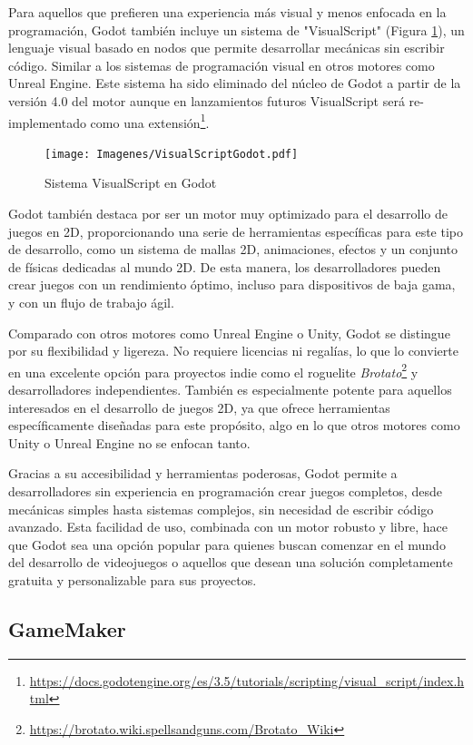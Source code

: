 Para aquellos que prefieren una experiencia más visual y menos enfocada en la programación, Godot también incluye un sistema de "VisualScript" (Figura \ref{fig:Godot_VisualScript_Figure}), un lenguaje visual basado en nodos que permite desarrollar mecánicas sin escribir código. Similar a los sistemas de programación visual en otros motores como Unreal Engine. Este sistema ha sido eliminado del núcleo de Godot a partir de la versión 4.0 del motor aunque en lanzamientos futuros VisualScript será re-implementado como una extensión\footnote{\url{https://docs.godotengine.org/es/3.5/tutorials/scripting/visual_script/index.html}}.

\begin{figure}[h]
	\centering
	\texttt{[image: Imagenes/VisualScriptGodot.pdf]}
	\caption{Sistema VisualScript en Godot}
	\label{fig:Godot_VisualScript_Figure}
\end{figure}
Godot también destaca por ser un motor muy optimizado para el desarrollo de juegos en 2D, proporcionando una serie de herramientas específicas para este tipo de desarrollo, como un sistema de mallas 2D, animaciones, efectos y un conjunto de físicas dedicadas al mundo 2D. De esta manera, los desarrolladores pueden crear juegos con un rendimiento óptimo, incluso para dispositivos de baja gama, y con un flujo de trabajo ágil.

Comparado con otros motores como Unreal Engine o Unity, Godot se distingue por su flexibilidad y ligereza. No requiere licencias ni regalías, lo que lo convierte en una excelente opción para proyectos indie como el roguelite \textit{Brotato}\footnote{\url{https://brotato.wiki.spellsandguns.com/Brotato_Wiki}} y desarrolladores independientes. También es especialmente potente para aquellos interesados en el desarrollo de juegos 2D, ya que ofrece herramientas específicamente diseñadas para este propósito, algo en lo que otros motores como Unity o Unreal Engine no se enfocan tanto.

Gracias a su accesibilidad y herramientas poderosas, Godot permite a desarrolladores sin experiencia en programación crear juegos completos, desde mecánicas simples hasta sistemas complejos, sin necesidad de escribir código avanzado. Esta facilidad de uso, combinada con un motor robusto y libre, hace que Godot sea una opción popular para quienes buscan comenzar en el mundo del desarrollo de videojuegos o aquellos que desean una solución completamente gratuita y personalizable para sus proyectos.
\subsection{GameMaker}
